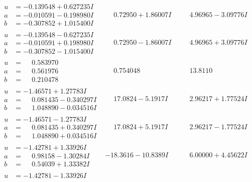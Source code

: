 \documentclass[1p]{elsarticle_modified}
\theoremstyle{definition}
\begin{document}
$$\begin{array}{c|c|c}
\begin{aligned}
u &= -0.139548 + 0.627235 I \\
a &= -0.010591 - 0.198980 I \\
b &= -0.307852 + 1.015400 I\end{aligned}
 & \phantom{-}0.72950 + 1.86007 I & \phantom{-}4.96965 - 3.09776 I \\ \hline\begin{aligned}
u &= -0.139548 - 0.627235 I \\
a &= -0.010591 + 0.198980 I \\
b &= -0.307852 - 1.015400 I\end{aligned}
 & \phantom{-}0.72950 - 1.86007 I & \phantom{-}4.96965 + 3.09776 I \\ \hline\begin{aligned}
u &= \phantom{-}0.583970\phantom{ +0.000000I} \\
a &= \phantom{-}0.561976\phantom{ +0.000000I} \\
b &= \phantom{-}0.210478\phantom{ +0.000000I}\end{aligned}
 & \phantom{-}0.754048\phantom{ +0.000000I} & \phantom{-}13.8110\phantom{ +0.000000I} \\ \hline\begin{aligned}
u &= -1.46571 + 1.27783 I \\
a &= \phantom{-}0.081435 - 0.340297 I \\
b &= \phantom{-}1.048890 - 0.034516 I\end{aligned}
 & \phantom{-}17.0824 - 5.1917 I & \phantom{-}2.96217 + 1.77524 I \\ \hline\begin{aligned}
u &= -1.46571 - 1.27783 I \\
a &= \phantom{-}0.081435 + 0.340297 I \\
b &= \phantom{-}1.048890 + 0.034516 I\end{aligned}
 & \phantom{-}17.0824 + 5.1917 I & \phantom{-}2.96217 - 1.77524 I \\ \hline\begin{aligned}
u &= -1.42781 + 1.33926 I \\
a &= \phantom{-}0.98158 - 1.30284 I \\
b &= \phantom{-}0.54039 + 1.33382 I\end{aligned}
 & -18.3616 - 10.8389 I & \phantom{-}6.00000 + 4.45622 I \\ \hline\begin{aligned}
u &= -1.42781 - 1.33926 I \\

\end{aligned}
\end{array}$$
\end{document}
